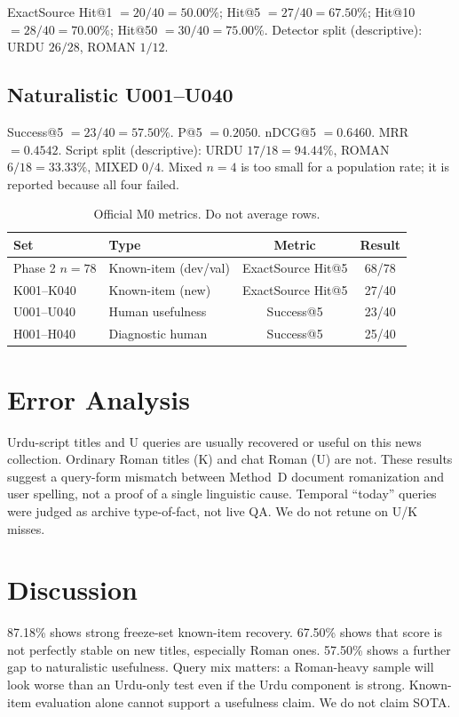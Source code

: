 \documentclass[conference]{IEEEtran}
\begin{document}
ExactSource Hit@1 $=20/40=50.00\%$; Hit@5 $=27/40=67.50\%$; Hit@10 $=28/40=70.00\%$; Hit@50 $=30/40=75.00\%$. Detector split (descriptive): URDU $26/28$, ROMAN $1/12$.

\subsection{Naturalistic U001--U040}

Success@5 $=23/40=57.50\%$. P@5 $=0.2050$. nDCG@5 $=0.6460$. MRR $=0.4542$. Script split (descriptive): URDU $17/18=94.44\%$, ROMAN $6/18=33.33\%$, MIXED $0/4$. Mixed $n=4$ is too small for a population rate; it is reported because all four failed.

\begin{table}[t]
\caption{Official M0 metrics. Do not average rows.}
\label{tab:official}
\centering
\begin{tabular}{llcc}
\toprule
\textbf{Set} & \textbf{Type} & \textbf{Metric} & \textbf{Result} \\
\midrule
Phase 2 $n{=}78$ & Known-item (dev/val) & ExactSource Hit@5 & 68/78 \\
K001--K040 & Known-item (new) & ExactSource Hit@5 & 27/40 \\
U001--U040 & Human usefulness & Success@5 & 23/40 \\
H001--H040 & Diagnostic human & Success@5 & 25/40 \\
\bottomrule
\end{tabular}
\end{table}

\section{Error Analysis}

Urdu-script titles and U queries are usually recovered or useful on this news collection. Ordinary Roman titles (K) and chat Roman (U) are not. These results suggest a query-form mismatch between Method~D document romanization and user spelling, not a proof of a single linguistic cause. Temporal ``today'' queries were judged as archive type-of-fact, not live QA. We do not retune on U/K misses.

\section{Discussion}

87.18\% shows strong freeze-set known-item recovery. 67.50\% shows that score is not perfectly stable on new titles, especially Roman ones. 57.50\% shows a further gap to naturalistic usefulness. Query mix matters: a Roman-heavy sample will look worse than an Urdu-only test even if the Urdu component is strong. Known-item evaluation alone cannot support a usefulness claim. We do not claim SOTA.
\end{document}
